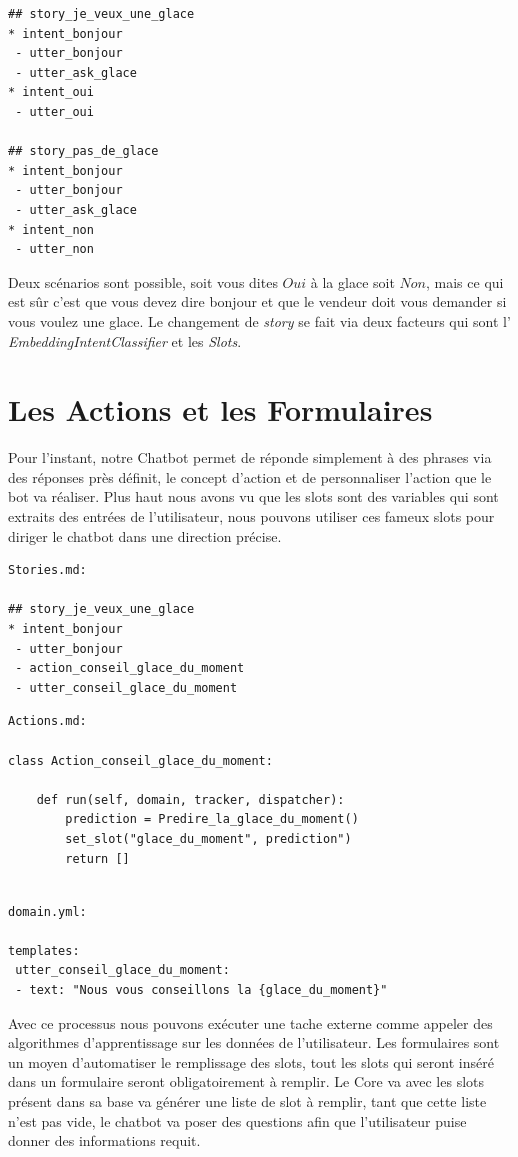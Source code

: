 \begin{lstlisting}
## story_je_veux_une_glace
* intent_bonjour
 - utter_bonjour
 - utter_ask_glace
* intent_oui
 - utter_oui
 
## story_pas_de_glace
* intent_bonjour
 - utter_bonjour
 - utter_ask_glace
* intent_non
 - utter_non
\end{lstlisting}

Deux scénarios sont possible, soit vous dites $Oui$ à la glace soit $Non$, mais ce qui est sûr c'est que vous devez dire bonjour et que le vendeur doit vous demander si vous voulez une glace.
Le changement de \textit{story} se fait via deux facteurs qui sont l' \textit{EmbeddingIntentClassifier} et les \textit{Slots}.

\section{Les Actions et les Formulaires}
Pour l'instant, notre Chatbot permet de réponde simplement à des phrases via des réponses près définit, le concept d'action et de personnaliser l'action que le bot va réaliser. Plus haut nous avons vu que les slots sont des variables qui sont extraits des entrées de l'utilisateur, nous pouvons utiliser ces fameux slots pour diriger le chatbot dans une direction précise.

\begin{lstlisting}
Stories.md:

## story_je_veux_une_glace
* intent_bonjour
 - utter_bonjour
 - action_conseil_glace_du_moment
 - utter_conseil_glace_du_moment
\end{lstlisting}

\begin{lstlisting}
Actions.md:

class Action_conseil_glace_du_moment:

	def run(self, domain, tracker, dispatcher):
		prediction = Predire_la_glace_du_moment()
		set_slot("glace_du_moment", prediction")
		return []
		
\end{lstlisting}

\begin{lstlisting}
domain.yml:

templates:
 utter_conseil_glace_du_moment:
 - text: "Nous vous conseillons la {glace_du_moment}"
\end{lstlisting}

Avec ce processus nous pouvons exécuter une tache externe comme appeler des algorithmes d'apprentissage sur les données de l'utilisateur.\linebreak
Les formulaires sont un moyen d'automatiser le remplissage des slots, tout les slots qui seront inséré dans un formulaire seront obligatoirement à remplir. Le Core va avec les slots présent dans sa base va générer une liste de slot à remplir, tant que cette liste n'est pas vide, le chatbot va poser des questions afin que l'utilisateur puise donner des informations requit.

